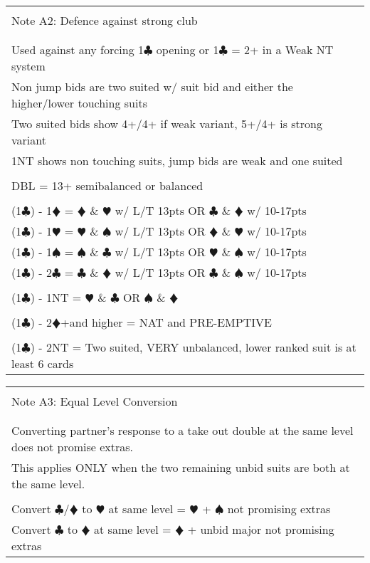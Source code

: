 \documentclass{article}
\newcommand\C{\ensuremath{\clubsuit}}
\newcommand\D{\color{red}\ensuremath{\vardiamondsuit}}
\renewcommand\H{\color{red}\ensuremath{\varheartsuit}}
\renewcommand\S{\ensuremath{\spadesuit}}
\newcommand\N{{\footnotesize NT}}
\begin{document}
\begin{tabular}{|l|}
\hline \\[-1em]
\cellcolor{green!25} \Large Note A2: Defence against strong club \\[-1em] 
\\ \hline
\\
\Large Used against any forcing 1{\C} opening or {1\C} = 2+ in a Weak NT system \\
\Large Non jump bids are two suited w/ suit bid and either the higher/lower touching suits \\
\Large Two suited bids show 4+/4+ if weak variant, 5+/4+ is strong variant \\
\Large 1NT shows non touching suits, jump bids are weak and one suited \\
\\
\Large DBL = 13+ semibalanced or balanced \\
\\
\Large (1{\C}) - 1{\D} = {\D} \& {\H} w/ L/T 13pts OR {\C} \& {\D} w/ 10-17pts \\
\Large (1{\C}) - 1{\H} = {\H} \& {\S} w/ L/T 13pts OR {\D} \& {\H} w/ 10-17pts \\
\Large (1{\C}) - 1{\S} = {\S} \& {\C} w/ L/T 13pts OR {\H} \& {\S} w/ 10-17pts \\
\Large (1{\C}) - 2{\C} = {\C} \& {\D} w/ L/T 13pts OR {\C} \& {\S} w/ 10-17pts \\
\\
\Large (1{\C}) - 1{\N} = {\H} \& {\C} OR {\S} \& {\D} \\
\\
\Large (1{\C}) - 2{\D}+and higher = NAT and PRE-EMPTIVE \\
\\
\Large (1{\C}) - 2{\N} = Two suited, VERY unbalanced, lower ranked suit is at least 6 cards

\\ \hline
\end{tabular}

\begin{tabular}{|l|}
\hline \\[-1em]
\cellcolor{green!25} \Large Note A3: Equal Level Conversion\\[-1em] 
\\ \hline
\\
\Large Converting partner's response to a take out double at the same level does not promise extras. \\ 
\Large This applies ONLY when the two remaining unbid suits are both at the same level. \\
\\ \Large Convert {\C}/{\D} to {\H} at same level = {\H} + {\S} not promising extras
\\ \Large Convert {\C} to {\D} at same level = {\D} + unbid major not promising extras

\\ \hline
\end{tabular}
\end{document}
